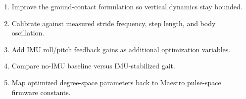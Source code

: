 \documentclass[11pt]{article}
\begin{document}
\begin{enumerate}
    \item Improve the ground-contact formulation so vertical dynamics stay bounded.
    \item Calibrate against measured stride frequency, step length, and body oscillation.
    \item Add IMU roll/pitch feedback gains as additional optimization variables.
    \item Compare no-IMU baseline versus IMU-stabilized gait.
    \item Map optimized degree-space parameters back to Maestro pulse-space firmware constants.
\end{enumerate}
\end{document}
